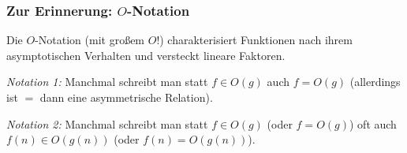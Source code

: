 \documentclass[onlymath]{beamer}
\begin{document}
\begin{frame}\frametitle{Zur Erinnerung: $O$-Notation}

Die $O$-Notation (mit großem $O$!) charakterisiert Funktionen nach ihrem asymptotischen Verhalten und
versteckt lineare Faktoren.

\pause

\emph{Notation 1:} Manchmal schreibt man statt $f\in O(g)$ auch $f=O(g)$ (allerdings ist $=$ dann eine
asymmetrische Relation).\medskip

\emph{Notation 2:} Manchmal schreibt man statt $f\in O(g)$ (oder $f=O(g)$) oft auch $f(n)\in O(g(n))$ (oder $f(n)=O(g(n))$).


\end{frame}
\end{document}
